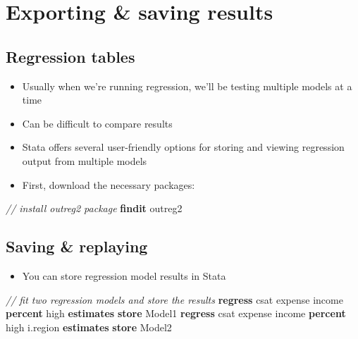 \documentclass[]{book}
\newenvironment{Shaded}{\begin{snugshade}}{\end{snugshade}}
\newcommand{\CommentTok}[1]{\textcolor[rgb]{0.56,0.35,0.01}{\textit{#1}}}
\newcommand{\KeywordTok}[1]{\textcolor[rgb]{0.13,0.29,0.53}{\textbf{#1}}}
\newcommand{\NormalTok}[1]{#1}
\providecommand{\tightlist}{%
  \setlength{\itemsep}{0pt}\setlength{\parskip}{0pt}}
\begin{document}
\hypertarget{exporting-saving-results}{%
\section{Exporting \& saving results}\label{exporting-saving-results}}

\hypertarget{regression-tables}{%
\subsection{Regression tables}\label{regression-tables}}

\begin{itemize}
\tightlist
\item
  Usually when we're running regression, we'll be testing multiple models at a time
\item
  Can be difficult to compare results
\item
  Stata offers several user-friendly options for storing and viewing regression output from multiple models
\item
  First, download the necessary packages:
\end{itemize}

\begin{Shaded}
\begin{Highlighting}[]
  \CommentTok{// install outreg2 package}
  \KeywordTok{findit}\NormalTok{ outreg2}
\end{Highlighting}
\end{Shaded}

\hypertarget{saving-replaying}{%
\subsection{Saving \& replaying}\label{saving-replaying}}

\begin{itemize}
\tightlist
\item
  You can store regression model results in Stata
\end{itemize}

\begin{Shaded}
\begin{Highlighting}[]
  \CommentTok{// fit two regression models and store the results}
  \KeywordTok{regress}\NormalTok{ csat expense income }\KeywordTok{percent}\NormalTok{ high}
  \KeywordTok{estimates} \KeywordTok{store}\NormalTok{ Model1}
  \KeywordTok{regress}\NormalTok{ csat expense income }\KeywordTok{percent}\NormalTok{ high i.region}
  \KeywordTok{estimates} \KeywordTok{store}\NormalTok{ Model2}
\end{Highlighting}
\end{Shaded}
\end{document}
